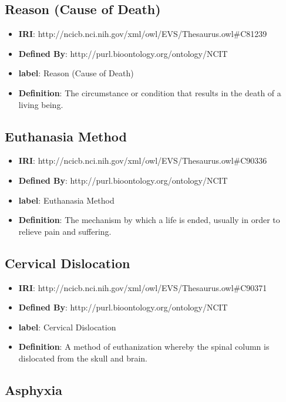 \documentclass[a4paper,12pt,oneside]{article}
\begin{document}
\subsection{Reason (Cause of Death)}

\begin{itemize}
	\item \textbf{IRI}: http://ncicb.nci.nih.gov/xml/owl/EVS/Thesaurus.owl\#C81239
	\item \textbf{Defined By}: http://purl.bioontology.org/ontology/NCIT
	\item \textbf{label}: Reason (Cause of Death)
	\item \textbf{Definition}: The circumstance or condition that results in the death of a living being.
\end{itemize} 

  \subsection{Euthanasia Method}

\begin{itemize}
	\item \textbf{IRI}:  	
	http://ncicb.nci.nih.gov/xml/owl/EVS/Thesaurus.owl\#C90336
	\item \textbf{Defined By}: http://purl.bioontology.org/ontology/NCIT
	\item \textbf{label}: Euthanasia Method
	\item \textbf{Definition}: The mechanism by which a life is ended, usually in order to relieve pain and suffering.
\end{itemize} 
 
  \subsection{Cervical Dislocation}
 
 \begin{itemize}
 	\item \textbf{IRI}:  	 	
 	http://ncicb.nci.nih.gov/xml/owl/EVS/Thesaurus.owl\#C90371
 	\item \textbf{Defined By}: http://purl.bioontology.org/ontology/NCIT
 	\item \textbf{label}: Cervical Dislocation
 	\item \textbf{Definition}: A method of euthanization whereby the spinal column is dislocated from the skull and brain.
 \end{itemize}  
 
   \subsection{Asphyxia}
 
\end{document}
